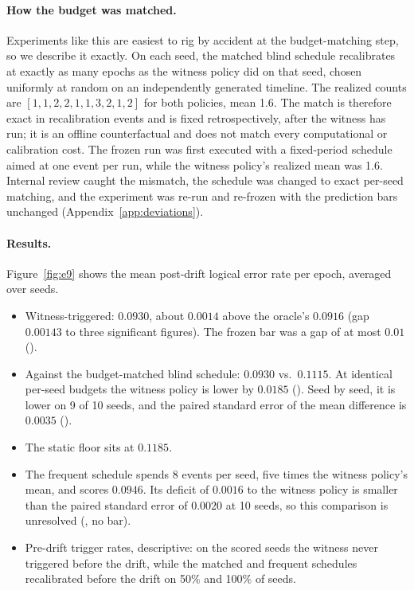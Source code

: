 \paragraph{How the budget was matched.} Experiments like this are easiest to rig by accident at the budget-matching step, so we describe it exactly. On each seed, the matched blind schedule recalibrates at exactly as many epochs as the witness policy did on that seed, chosen uniformly at random on an independently generated timeline. The realized counts are $[1,1,2,2,1,1,3,2,1,2]$ for both policies, mean 1.6. %
The match is therefore exact in recalibration events and is fixed retrospectively, after the witness has run; it is an offline counterfactual and does not match every computational or calibration cost. The frozen run was first executed with a fixed-period schedule aimed at one event per run, while the witness policy's realized mean was 1.6. Internal review caught the mismatch, the schedule was changed to exact per-seed matching, and the experiment was re-run and re-frozen with the prediction bars unchanged (Appendix~\ref{app:deviations}).

\paragraph{Results.} Figure~\ref{fig:e9} shows the mean post-drift logical error rate per epoch, averaged over seeds.
\begin{itemize}
\item Witness-triggered: $0.0930$, about $0.0014$ above the oracle's $0.0916$ (gap $0.00143$ to three significant figures). The frozen bar was a gap of at most $0.01$ (\gRegPos). %
\item Against the budget-matched blind schedule: $0.0930$ vs.\ $0.1115$. At identical per-seed budgets the witness policy is lower by $0.0185$ (\gRegPos). %
Seed by seed, it is lower on 9 of 10 seeds, and the paired standard error of the mean difference is $0.0035$ (\gMeasured). %
\item The static floor sits at $0.1185$. %
\item The frequent schedule spends 8 events per seed, five times the witness policy's mean, and scores $0.0946$. Its deficit of $0.0016$ to the witness policy is smaller than the paired standard error of $0.0020$ at 10 seeds, so this comparison is unresolved (\gMeasured, no bar). %
\item Pre-drift trigger rates, descriptive: on the scored seeds the witness never triggered before the drift, while the matched and frequent schedules recalibrated before the drift on 50\% and 100\% of seeds. %
\end{itemize}

